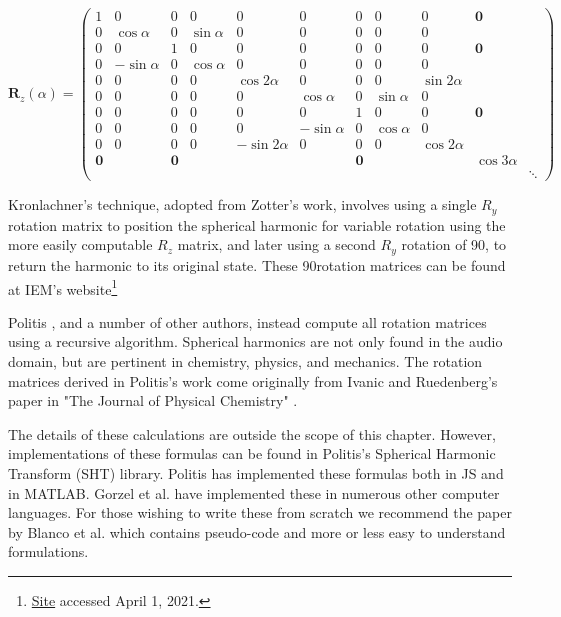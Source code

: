 \begin{equation}
\boldsymbol{R}_z(\alpha)=\left(\begin{array}{c|ccc|ccccc|cc}
1 & 0 & 0 & 0 & 0 & 0 & 0 & 0 & 0 & \mathbf{0} & \\
\hline 0 & \cos \alpha & 0 & \sin \alpha & 0 & 0 & 0 & 0 & 0 & \\
0 & 0 & 1 & 0 & 0 & 0 & 0 & 0 & 0 & \mathbf{0} & \\
0 & -\sin \alpha & 0 & \cos \alpha & 0 & 0 & 0 & 0 & 0 & & \\
\hline 0 & 0 & 0 & 0 & \cos 2 \alpha & 0 & 0 & 0 & \sin 2 \alpha & & \\
0 & 0 & 0 & 0 & 0 & \cos \alpha & 0 & \sin \alpha & 0 & \\
0 & 0 & 0 & 0 & 0 & 0 & 1 & 0 & 0 & \mathbf{0} & \\
0 & 0 & 0 & 0 & 0 & -\sin \alpha & 0 & \cos \alpha & 0 & & \\
0 & 0 & 0 & 0 & -\sin 2 \alpha & 0 & 0 & 0 & \cos 2 \alpha & & \\
\hline \mathbf{0} & & \mathbf{0} & & & & \mathbf{0} & & & \cos 3 \alpha & \\
 & & & & & & & & & & \ddots
\end{array}\right)
\end{equation}

Kronlachner's technique, adopted from Zotter's work, involves using a single $R_{y}$ rotation matrix to position the spherical harmonic for variable rotation using the more easily computable $R_{z}$ matrix, and later using a second $R_{y}$ rotation of 90\textdegree, to return the harmonic to its original state. These 90\textdegree rotation matrices can be found at IEM's website\footnote{\href{https://ambisonics.iem.at/xchange/fileformat/docs/spherical-harmonics-rotation}{Site} accessed April 1, 2021.}


Politis \cite{politis2016jsambisonics}, and a number of other authors, instead compute all rotation matrices using a recursive algorithm. Spherical harmonics are not only found in the audio domain, but are pertinent in chemistry, physics, and mechanics. The rotation matrices derived in Politis's work come originally from Ivanic and Ruedenberg's paper in "The Journal of Physical Chemistry" \cite{ivanic1996rotation}. 

The details of these calculations are outside the scope of this chapter. However, implementations of these formulas can be found in Politis's Spherical Harmonic Transform (SHT) library. Politis has implemented these formulas both in JS and in MATLAB. Gorzel et al. \cite{gorzel2019efficient} have implemented these in numerous other computer languages. For those wishing to write these from scratch we recommend the paper by Blanco et al. \cite{blanco1997evaluation} which contains pseudo-code and more or less easy to understand formulations. 

